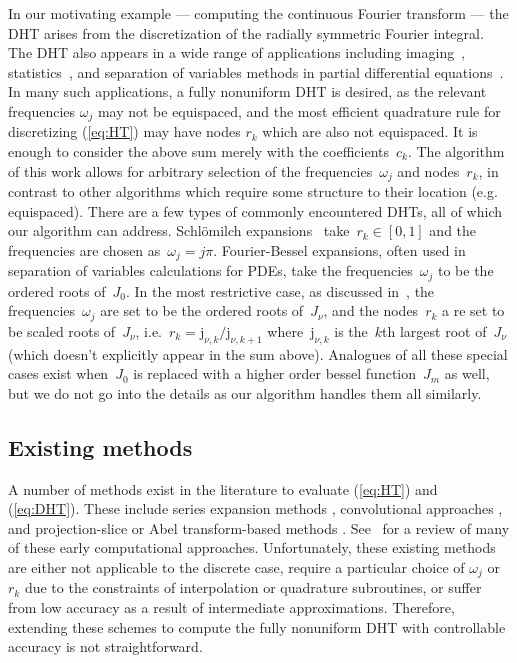In our motivating example --- computing the continuous Fourier transform --- the
DHT arises from the discretization of the radially symmetric Fourier integral.
The DHT also appears in a wide range of applications including
imaging~\cite{higgins1988hankel, zhao2013fourier, marshall2023fast},
statistics~\cite{lord1954a, genton2002nonparametric}, and separation of
variables methods in partial differential
equations~\cite{bisseling1985fast,ali1999generalized, zhou2022spectral}. In many
such applications, a fully nonuniform DHT is desired, as the relevant
frequencies $\omega_j$ may not be equispaced, and the most efficient quadrature
rule for discretizing (\ref{eq:HT}) may have nodes $r_k$ which are also not
equispaced. It is enough to consider the above sum merely with the
coefficients~$c_k$. The algorithm of this work allows for arbitrary selection of
the frequencies~$\omega_j$ and nodes~$r_k$, in contrast to other algorithms
which require some structure to their location (e.g. equispaced). There are a
few types of commonly encountered DHTs, all of which our algorithm can address.
Schl\"omilch expansions~\cite{linton2006schlomilch,townsend2015fast}
take~$r_k \in [0,1]$ and the frequencies are chosen as~$\omega_j =
j\pi$. Fourier-Bessel expansions, often used in separation of variables
calculations for PDEs, take the frequencies~$\omega_j$ to be the ordered roots
of~$J_0$. In the most restrictive case, as discussed in~\cite{johnson1987improved}, the
frequencies~$\omega_j$ are set to be the ordered roots of~$J_\nu$, and the
nodes~$r_k$ a re set to be scaled roots of~$J_\nu$,
i.e.~$r_k = \mathrm{j}_{\nu,k}/\mathrm{j}_{\nu,k+1}$ where~$\mathrm{j}_{\nu,k}$
is the~$k$th largest root of~$J_\nu$ (which doesn't explicitly appear in the sum
above). Analogues of all these special cases exist when~$J_0$ is replaced with a
higher order bessel function~$J_m$ as well, but we do not go into the details as
our algorithm handles them all similarly.

\subsection*{Existing methods}
\label{sec:existing}

A number of methods exist in the literature to evaluate (\ref{eq:HT}) and
(\ref{eq:DHT}). These include series expansion methods
\cite{lord1954b,brunol1977fourier,cavanagh1979numerical}, convolutional
approaches \cite{siegman1977quasi, johansen1979fast, mook1983algorithm}, and
projection-slice or Abel transform-based methods \cite{oppenheim1980computation,
hansen1985fast, kapur1995algorithm}. See~\cite{cree1993algorithms} for a review
of many of these early computational approaches. Unfortunately, these existing
methods are either not applicable to the discrete case, require a particular
choice of $\omega_j$ or $r_k$ due to the constraints of interpolation or
quadrature subroutines, or suffer from low accuracy as a result of intermediate
approximations. Therefore, extending these schemes to compute the fully
nonuniform DHT with controllable accuracy is not straightforward.

